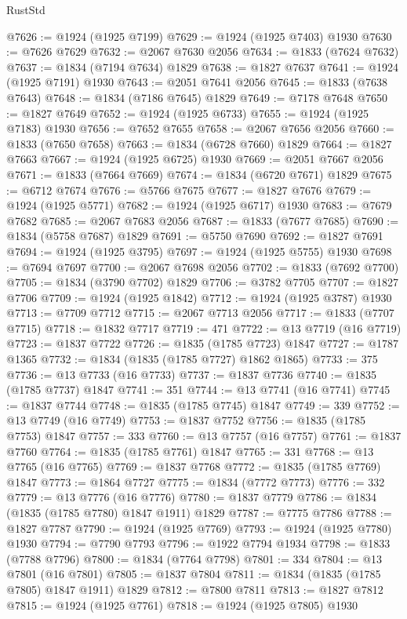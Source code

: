 \begin{lexlean}{RustStd}
\begin{coremodule}
@7626 := @1924 (@1925 @7199)
@7629 := @1924 (@1925 @7403) @1930
@7630 := @7626 @7629
@7632 := @2067 @7630 @2056
@7634 := @1833 (@7624 @7632)
@7637 := @1834 (@7194 @7634) @1829
@7638 := @1827 @7637
@7641 := @1924 (@1925 @7191) @1930
@7643 := @2051 @7641 @2056
@7645 := @1833 (@7638 @7643)
@7648 := @1834 (@7186 @7645) @1829
@7649 := @7178 @7648
@7650 := @1827 @7649
@7652 := @1924 (@1925 @6733)
@7655 := @1924 (@1925 @7183) @1930
@7656 := @7652 @7655
@7658 := @2067 @7656 @2056
@7660 := @1833 (@7650 @7658)
@7663 := @1834 (@6728 @7660) @1829
@7664 := @1827 @7663
@7667 := @1924 (@1925 @6725) @1930
@7669 := @2051 @7667 @2056
@7671 := @1833 (@7664 @7669)
@7674 := @1834 (@6720 @7671) @1829
@7675 := @6712 @7674
@7676 := @5766 @7675
@7677 := @1827 @7676
@7679 := @1924 (@1925 @5771)
@7682 := @1924 (@1925 @6717) @1930
@7683 := @7679 @7682
@7685 := @2067 @7683 @2056
@7687 := @1833 (@7677 @7685)
@7690 := @1834 (@5758 @7687) @1829
@7691 := @5750 @7690
@7692 := @1827 @7691
@7694 := @1924 (@1925 @3795)
@7697 := @1924 (@1925 @5755) @1930
@7698 := @7694 @7697
@7700 := @2067 @7698 @2056
@7702 := @1833 (@7692 @7700)
@7705 := @1834 (@3790 @7702) @1829
@7706 := @3782 @7705
@7707 := @1827 @7706
@7709 := @1924 (@1925 @1842)
@7712 := @1924 (@1925 @3787) @1930
@7713 := @7709 @7712
@7715 := @2067 @7713 @2056
@7717 := @1833 (@7707 @7715)
@7718 := @1832 @7717
@7719 := 471
@7722 := @13 @7719 (@16 @7719)
@7723 := @1837 @7722
@7726 := @1835 (@1785 @7723) @1847
@7727 := @1787 @1365
@7732 := @1834 (@1835 (@1785 @7727) @1862 @1865)
@7733 := 375
@7736 := @13 @7733 (@16 @7733)
@7737 := @1837 @7736
@7740 := @1835 (@1785 @7737) @1847
@7741 := 351
@7744 := @13 @7741 (@16 @7741)
@7745 := @1837 @7744
@7748 := @1835 (@1785 @7745) @1847
@7749 := 339
@7752 := @13 @7749 (@16 @7749)
@7753 := @1837 @7752
@7756 := @1835 (@1785 @7753) @1847
@7757 := 333
@7760 := @13 @7757 (@16 @7757)
@7761 := @1837 @7760
@7764 := @1835 (@1785 @7761) @1847
@7765 := 331
@7768 := @13 @7765 (@16 @7765)
@7769 := @1837 @7768
@7772 := @1835 (@1785 @7769) @1847
@7773 := @1864 @7727
@7775 := @1834 (@7772 @7773)
@7776 := 332
@7779 := @13 @7776 (@16 @7776)
@7780 := @1837 @7779
@7786 := @1834 (@1835 (@1785 @7780) @1847 @1911) @1829
@7787 := @7775 @7786
@7788 := @1827 @7787
@7790 := @1924 (@1925 @7769)
@7793 := @1924 (@1925 @7780) @1930
@7794 := @7790 @7793
@7796 := @1922 @7794 @1934
@7798 := @1833 (@7788 @7796)
@7800 := @1834 (@7764 @7798)
@7801 := 334
@7804 := @13 @7801 (@16 @7801)
@7805 := @1837 @7804
@7811 := @1834 (@1835 (@1785 @7805) @1847 @1911) @1829
@7812 := @7800 @7811
@7813 := @1827 @7812
@7815 := @1924 (@1925 @7761)
@7818 := @1924 (@1925 @7805) @1930

\end{coremodule}
\end{lexlean}
